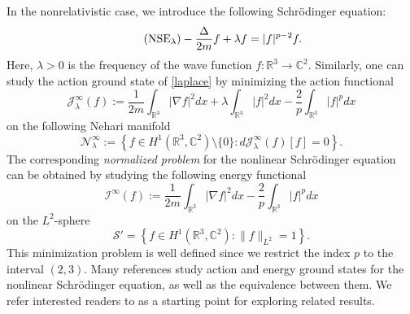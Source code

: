 \documentclass{amsart}
\theoremstyle{plain}
\theoremstyle{definition}
\theoremstyle{remark}
\numberwithin{equation}{section} \numberwithin{figure}{section}
\begin{document}
In the nonrelativistic case, we introduce the following Schr\"odinger equation:
\begin{align}\label{laplace}\tag{$\mathrm{NSE}_{\mathrm{\lambda}}$}
- \frac{\Delta}{2m} f +\lambda f=|f|^{p-2}f .
\end{align}
Here, $\lambda>0$ is the frequency of the wave function $f:\mathbb{R}^3\rightarrow \mathbb{C}^2$.  
Similarly, one can study the action ground state of \eqref{laplace}
by minimizing the action functional 
\begin{equation*}
	\mathcal{J}^\infty_\lambda(f):= \frac{1}{2m}\int_{\mathbb{R}^3} |\nabla
	f|^2 dx + \lambda\int_{\mathbb{R}^3} | f|^2 dx-\frac{2}{p}\int_{\mathbb{R}^3 } |f|^p dx
\end{equation*}
on the following Nehari manifold
\begin{equation*}
	\mathcal{N}^\infty_\lambda:= \left\{f\in H^{1}(\mathbb{R}^3,\mathbb{C}^2) \setminus
	\{0\}: d\mathcal{J}^\infty_\lambda(f)[f] = 0 \right\}.
\end{equation*}
The corresponding {\it normalized problem} for the nonlinear Schr\"odinger equation can be obtained by studying the following energy functional
\begin{equation*}
	\mathcal{I}^\infty(f):= \frac{1}{2m}\int_{\mathbb{R}^3} |\nabla
	f|^2 dx -\frac{2}{p}\int_{\mathbb{R}^3 } |f|^p dx
\end{equation*}
on the $L^2$-sphere
\begin{equation*}
	    \mathcal{S}'= \left\{f\in H^{1}(\mathbb{R}^3, \mathbb{C}^2):
	    \|f\|_{L^2}=1\right\}.
\end{equation*}
This minimization problem is well defined since we restrict the index $p$ to the interval $(2, 3)$. Many references study action and energy ground states for the nonlinear Schrödinger equation, as well as the equivalence between them. We refer interested readers to \cite{DST23} as a starting point for exploring related results.
\end{document}

